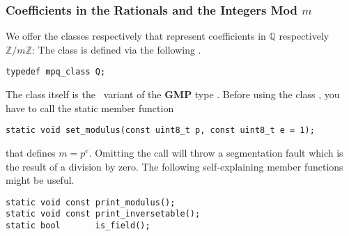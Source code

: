 \subsubsection{Coefficients in the Rationals and the Integers Mod \texorpdfstring{$m$}{m}}
\label{program:libhomology:CoefficientT:our_implementation}
We offer the classes  respectively  that represent coefficients in $\mathbb Q$ respectively $\mathbb Z / m \mathbb Z$:
The class  is defined via the following .
\begin{lstlisting}
typedef mpq_class Q;
\end{lstlisting}
The class  itself is the \cpp\ variant of the {\bf GMP} type .
Before using the class , you have to call the static member function
\begin{lstlisting}
static void set_modulus(const uint8_t p, const uint8_t e = 1);
\end{lstlisting}
that defines $m = p^e$.
Omitting the call will throw a segmentation fault which is the result of a division by zero.
The following self-explaining member functions might be useful.
\begin{lstlisting}
static void const print_modulus();    
static void const print_inversetable();
static bool       is_field();
\end{lstlisting}
